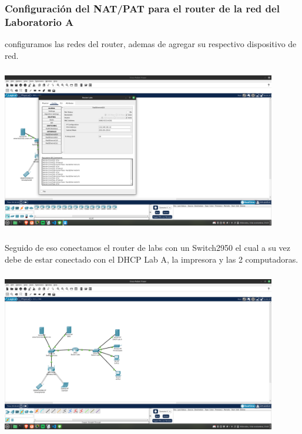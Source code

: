 \documentclass[14pt]{book}
\begin{document}
{\color{red} \subsubsection*{\textbf{Configuración del NAT/PAT para el router de la red del Laboratorio A}}}
\vspace{1em}

configuramos las redes del router, ademas de agregar su respectivo dispositivo de red.\\

\includegraphics[width=12cm, height=8cm]{images/confirouterlab.png}\\

Seguido de eso conectamos el router de labs con un Switch2950 el cual a su vez debe de estar conectado con el DHCP Lab A, la impresora y las 2 computadoras.\\

\includegraphics[width=12cm, height=8cm]{images/diagrama con laba.png}\\
\end{document}
